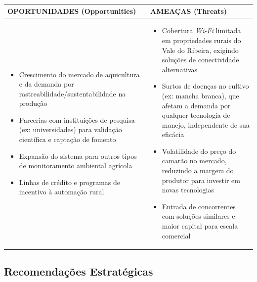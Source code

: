 \documentclass[11pt,a4paper]{article}
\begin{document}
\begin{table}[H]
\begin{tabular}{|p{7.2cm}|p{7.2cm}|}
\hline
\textbf{OPORTUNIDADES (Opportunities)} & \textbf{AMEAÇAS (Threats)} \\
\hline
\begin{minipage}[t]{7cm}\raggedright
\begin{itemize}
    \item Crescimento do mercado de aquicultura e da demanda por rastreabilidade/sustentabilidade na produção
    \item Parcerias com instituições de pesquisa (ex: universidades) para validação científica e captação de fomento
    \item Expansão do sistema para outros tipos de monitoramento ambiental agrícola
    \item Linhas de crédito e programas de incentivo à automação rural
\end{itemize}
\end{minipage}
&
\begin{minipage}[t]{7cm}\raggedright
\begin{itemize}
    \item Cobertura \textit{Wi-Fi} limitada em propriedades rurais do Vale do Ribeira, exigindo soluções de conectividade alternativas
    \item Surtos de doenças no cultivo (ex: mancha branca), que afetam a demanda por qualquer tecnologia de manejo, independente de sua eficácia
    \item Volatilidade do preço do camarão no mercado, reduzindo a margem do produtor para investir em novas tecnologias
    \item Entrada de concorrentes com soluções similares e maior capital para escala comercial
\end{itemize}
\end{minipage}
\\
\hline
\end{tabular}
\end{table}

\subsection{Recomendações Estratégicas}
\end{document}
